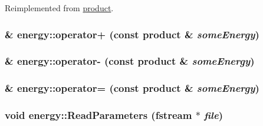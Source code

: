 Reimplemented from \hyperlink{classproduct_afcbfb1feadfd4ed057845eab47e37ff5}{product}.\hypertarget{classenergy_acd0d43ec7777b3f63658b7b1f430e579}{
\subsubsection[{operator+}]{ \& energy::operator+ (const {\bf product} \& {\em someEnergy})}}
\label{classenergy_acd0d43ec7777b3f63658b7b1f430e579}
\hypertarget{classenergy_ac3d1fa3eb361e25b316e3cc53c2590e4}{
\subsubsection[{operator-\/}]{ \& energy::operator-\/ (const {\bf product} \& {\em someEnergy})}}
\label{classenergy_ac3d1fa3eb361e25b316e3cc53c2590e4}
\hypertarget{classenergy_aaaba546a4978621479e3e26042463638}{
\subsubsection[{operator=}]{ \& energy::operator= (const {\bf product} \& {\em someEnergy})}}
\label{classenergy_aaaba546a4978621479e3e26042463638}
\hypertarget{classenergy_a96a835d94c0efef55af5279f533c0b77}{
\subsubsection[{ReadParameters}]{\setlength{\rightskip}{0pt plus 5cm}void energy::ReadParameters (fstream $\ast$ {\em file})}}
\label{classenergy_a96a835d94c0efef55af5279f533c0b77}


